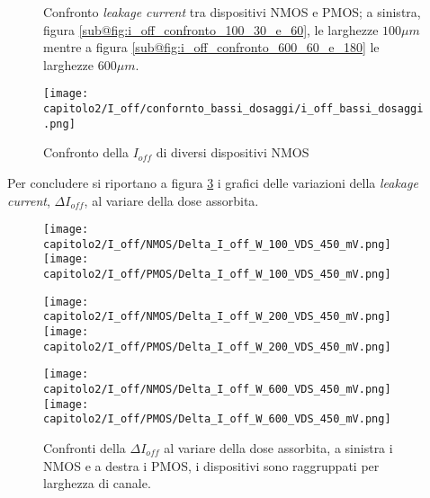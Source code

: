 \begin{figure}[h]
    \centering

    \caption[Confronto \textit{leakage current} tra dispositivi NMOS e PMOS]{Confronto \textit{leakage current} tra dispositivi NMOS e PMOS; a sinistra, figura \ref{sub@fig:i_off_confronto_100_30_e_60}, le larghezze $100\mu m$ mentre a figura \ref{sub@fig:i_off_confronto_600_60_e_180} le larghezze $600\mu m$.}
    \label{fig:i_off_confronto}
    
\end{figure}


\begin{figure}[h]
    \centering

    \texttt{[image: capitolo2/I\_off/confornto\_bassi\_dosaggi/i\_off\_bassi\_dosaggi.png]}
    \caption[Confronto della $I_{off}$ di diversi dispositivi NMOS]{Confronto della $I_{off}$ di diversi dispositivi NMOS}
    \label{fig:i_off_confronto_bassi_dosaggi}

\end{figure}

Per concludere si riportano a figura \ref{fig:delta_i_off} i grafici delle variazioni della \textit{leakage current}, $\Delta I_{off}$, al variare della dose assorbita.

\begin{figure}[ht]
    
    \texttt{[image: capitolo2/I\_off/NMOS/Delta\_I\_off\_W\_100\_VDS\_450\_mV.png]}
    \texttt{[image: capitolo2/I\_off/PMOS/Delta\_I\_off\_W\_100\_VDS\_450\_mV.png]}
    
    \vspace{0.5cm}

    \texttt{[image: capitolo2/I\_off/NMOS/Delta\_I\_off\_W\_200\_VDS\_450\_mV.png]}
    \texttt{[image: capitolo2/I\_off/PMOS/Delta\_I\_off\_W\_200\_VDS\_450\_mV.png]}
    
    \vspace{0.5cm}

    \texttt{[image: capitolo2/I\_off/NMOS/Delta\_I\_off\_W\_600\_VDS\_450\_mV.png]}
    \texttt{[image: capitolo2/I\_off/PMOS/Delta\_I\_off\_W\_600\_VDS\_450\_mV.png]}
    
    \caption[$\Delta I_{off}$ al variare della dose assorbita, NMOS e PMOS]{Confronti della $\Delta I_{off}$ al variare della dose assorbita, a sinistra i NMOS e a destra i PMOS, i dispositivi sono raggruppati per larghezza di canale.}
    \label{fig:delta_i_off}
\end{figure}